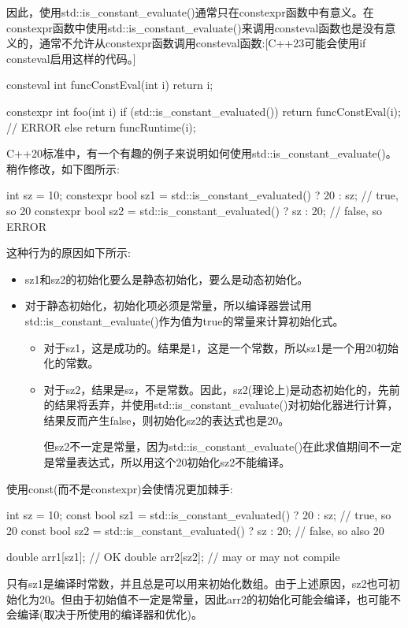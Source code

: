 因此，使用std::is\_constant\_evaluate()通常只在constexpr函数中有意义。在constexpr函数中使用std::is\_constant\_evaluate()来调用consteval函数也是没有意义的，通常不允许从constexpr函数调用consteval函数:[C++23可能会使用if consteval启用这样的代码。]

\begin{cpp}
consteval int funcConstEval(int i) {
	return i;
}

constexpr int foo(int i) {
	if (std::is_constant_evaluated()) {
		return funcConstEval(i); // ERROR
	}
	else {
		return funcRuntime(i);
	}
}
\end{cpp}


C++20标准中，有一个有趣的例子来说明如何使用std::is\_constant\_evaluate()。稍作修改，如下图所示:

\begin{cpp}
int sz = 10;
constexpr bool sz1 = std::is_constant_evaluated() ? 20 : sz; // true, so 20
constexpr bool sz2 = std::is_constant_evaluated() ? sz : 20; // false, so ERROR
\end{cpp}

这种行为的原因如下所示:

\begin{itemize}
\item 
sz1和sz2的初始化要么是静态初始化，要么是动态初始化。

\item 
对于静态初始化，初始化项必须是常量，所以编译器尝试用std::is\_constant\_evaluate()作为值为true的常量来计算初始化式。

\begin{itemize}
\item 
对于sz1，这是成功的。结果是1，这是一个常数，所以sz1是一个用20初始化的常数。

\item
对于sz2，结果是sz，不是常数。因此，sz2(理论上)是动态初始化的，先前的结果将丢弃，并使用std::is\_constant\_evaluate()对初始化器进行计算，结果反而产生false，则初始化sz2的表达式也是20。

但sz2不一定是常量，因为std::is\_constant\_evaluate()在此求值期间不一定是常量表达式，所以用这个20初始化sz2不能编译。
\end{itemize}
\end{itemize}

使用const(而不是constexpr)会使情况更加棘手:

\begin{cpp}
int sz = 10;
const bool sz1 = std::is_constant_evaluated() ? 20 : sz; // true, so 20
const bool sz2 = std::is_constant_evaluated() ? sz : 20; // false, so also 20

double arr1[sz1]; // OK
double arr2[sz2]; // may or may not compile
\end{cpp}

只有sz1是编译时常数，并且总是可以用来初始化数组。由于上述原因，sz2也可初始化为20。但由于初始值不一定是常量，因此arr2的初始化可能会编译，也可能不会编译(取决于所使用的编译器和优化)。


















